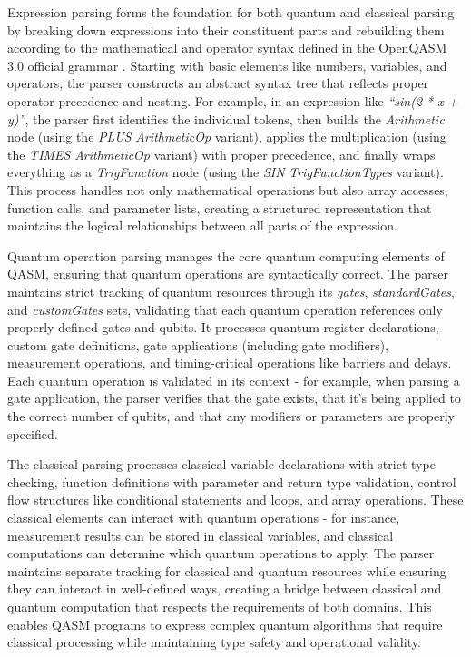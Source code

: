\documentclass{article}
\begin{document}
Expression parsing forms the foundation for both quantum and classical parsing by breaking down expressions into their constituent parts and rebuilding them according to the mathematical and operator syntax defined in the OpenQASM 3.0 official grammar \cite{noauthor_qasm_grammar_nodate}. Starting with basic elements like numbers, variables, and operators, the parser constructs an abstract syntax tree that reflects proper operator precedence and nesting. For example, in an expression like \textit{``sin(2 * x + y)''}, the parser first identifies the individual tokens, then builds the \textit{Arithmetic} node (using the \textit{PLUS} \textit{ArithmeticOp} variant), applies the multiplication (using the \textit{TIMES} \textit{ArithmeticOp} variant) with proper precedence, and finally wraps everything as a \textit{TrigFunction} node (using the \textit{SIN} \textit{TrigFunctionTypes} variant). This process handles not only mathematical operations but also array accesses, function calls, and parameter lists, creating a structured representation that maintains the logical relationships between all parts of the expression.

Quantum operation parsing manages the core quantum computing elements of QASM, ensuring that quantum operations are syntactically correct. The parser maintains strict tracking of quantum resources through its \textit{gates}, \textit{standardGates}, and \textit{customGates} sets, validating that each quantum operation references only properly defined gates and qubits. It processes quantum register declarations, custom gate definitions, gate applications (including gate modifiers), measurement operations, and timing-critical operations like barriers and delays. Each quantum operation is validated in its context - for example, when parsing a gate application, the parser verifies that the gate exists, that it's being applied to the correct number of qubits, and that any modifiers or parameters are properly specified. 

The classical parsing processes classical variable declarations with strict type checking, function definitions with parameter and return type validation, control flow structures like conditional statements and loops, and array operations. These classical elements can interact with quantum operations - for instance, measurement results can be stored in classical variables, and classical computations can determine which quantum operations to apply. The parser maintains separate tracking for classical and quantum resources while ensuring they can interact in well-defined ways, creating a bridge between classical and quantum computation that respects the requirements of both domains. This enables QASM programs to express complex quantum algorithms that require classical processing while maintaining type safety and operational validity.
\end{document}
